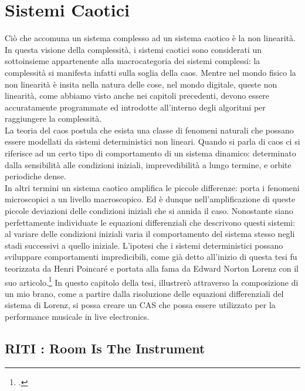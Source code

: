 
\section{Sistemi Caotici}
\label{sec:Sistemi Caotici}

Ciò che accomuna un sistema complesso ad un sistema caotico è la non linearità.
In questa visione della complessità, i sistemi caotici sono considerati un sottoinsieme 
appartenente alla macrocategoria dei sistemi complessi: la complessità 
si manifesta infatti sulla soglia della caos. 
Mentre nel mondo fisico la non linearità è insita nella natura
delle cose, nel mondo digitale, queste non linearità, come abbiamo visto
anche nei capitoli precedenti, devono essere accuratamente
programmate ed introdotte all’interno degli algoritmi per raggiungere la complessità. \\
La teoria del caos postula che esista una classe di fenomeni naturali che
possano essere modellati da sistemi deterministici non lineari.
Quando si parla di caos ci si riferisce ad un certo tipo di comportamento di
un sistema dinamico: determinato dalla sensibilità alle condizioni iniziali,
imprevedibilità a lungo termine, e orbite periodiche dense. \\ 
In altri termini un sistema caotico amplifica le piccole differenze: porta i fenomeni microscopici
a un livello macroscopico. Ed è dunque nell’amplificazione di queste piccole
deviazioni delle condizioni iniziali che si annida il caso.
Nonostante siano perfettamente individuate le equazioni differenziali che
descrivono questi sistemi: al variare delle condizioni iniziali 
varia il comportamento del sistema stesso negli stadi successivi a quello iniziale.
L’ipotesi che i sistemi deterministici possano sviluppare comportamenti impredicibili, 
come già detto all'inizio di questa tesi fu teorizzata da Henri Poincaré e portata alla
fama da Edward Norton Lorenz con il suo articolo.\footcite{Lorenzdnf}
In questo capitolo della tesi, illustrerò attraverso la composizione di un mio brano, 
come a partire dalla risoluzione delle equazioni differenziali del sistema di Lorenz, si possa
creare un CAS che possa essere utilizzato per la
performance musicale in live electronics.

\subsection{RITI : Room Is The Instrument}
\label{RITI : Room Is The Instrument}


